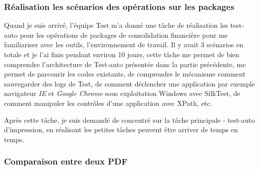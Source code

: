     \subsubsection{Réalisation les scénarios des opérations sur les packages}
    Quand je suis arrivé, l'équipe Test m'a donné une tâche de réalisation les test-auto pour les opérations de packages de consolidation financière pour me familiariser avec les outils, l'environnement de travail. Il y avait 3 scénarios en totale et je l'ai finis pendant environ 10 jours, cette tâche me permet de bien comprendre l'architecture de Test-auto présentée dans la partie précédente, me permet de parcourir les codes existants, de comprendre le mécanisme comment sauvegarder des logs de Test, de comment déclencher une application par exemple navigateur \textit{IE} et \textit{Google Chrome} sous exploitation Windows avec SilkTest, de comment manipuler les contrôles d'une application avec XPath, etc.
    
    \par Après cette tâche, je suis demandé de concentré sur la tâche principale - test-auto d'impression, en réalisant les petites tâches peuvent être arriver de temps en temps. 
    \subsubsection{Comparaison entre deux PDF}
    
